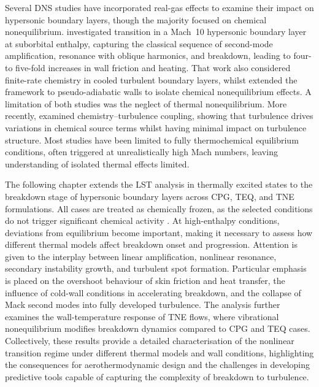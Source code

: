 Several \gls{DNS} studies have incorporated real-gas effects to examine their impact on hypersonic boundary layers, though the majority focused on chemical nonequilibrium. \citet{DiRenzo2021} investigated transition in a Mach~10 hypersonic boundary layer at suborbital enthalpy, capturing the classical sequence of second-mode amplification, resonance with oblique harmonics, and breakdown, leading to four- to five-fold increases in wall friction and heating. That work also considered finite-rate chemistry in cooled turbulent boundary layers, whilst \citet{Passiatoreetal2021} extended the framework to pseudo-adiabatic walls to isolate chemical nonequilibrium effects. A limitation of both studies was the neglect of thermal nonequilibrium. More recently, \citet{Williamsetal2025} examined chemistry--turbulence coupling, showing that turbulence drives variations in chemical source terms whilst having minimal impact on turbulence structure. Most studies have been limited to fully thermochemical equilibrium conditions, often triggered at unrealistically high Mach numbers, leaving understanding of isolated thermal effects limited.

The following chapter extends the \gls{LST} analysis in thermally excited states to the breakdown stage of hypersonic boundary layers across \gls{CPG}, \gls{TEQ}, and \gls{TNE} formulations. All cases are treated as chemically frozen, as the selected conditions do not trigger significant chemical activity \citep{BitterShepherd2015}. At high-enthalpy conditions, deviations from equilibrium become important, making it necessary to assess how different thermal models affect breakdown onset and progression. Attention is given to the interplay between linear amplification, nonlinear resonance, secondary instability growth, and turbulent spot formation. Particular emphasis is placed on the overshoot behaviour of skin friction and heat transfer, the influence of cold-wall conditions in accelerating breakdown, and the collapse of Mack second modes into fully developed turbulence. The analysis further examines the wall-temperature response of \gls{TNE} flows, where vibrational nonequilibrium modifies breakdown dynamics compared to \gls{CPG} and \gls{TEQ} cases. Collectively, these results provide a detailed characterisation of the nonlinear transition regime under different thermal models and wall conditions, highlighting the consequences for aerothermodynamic design and the challenges in developing predictive tools capable of capturing the complexity of breakdown to turbulence.


